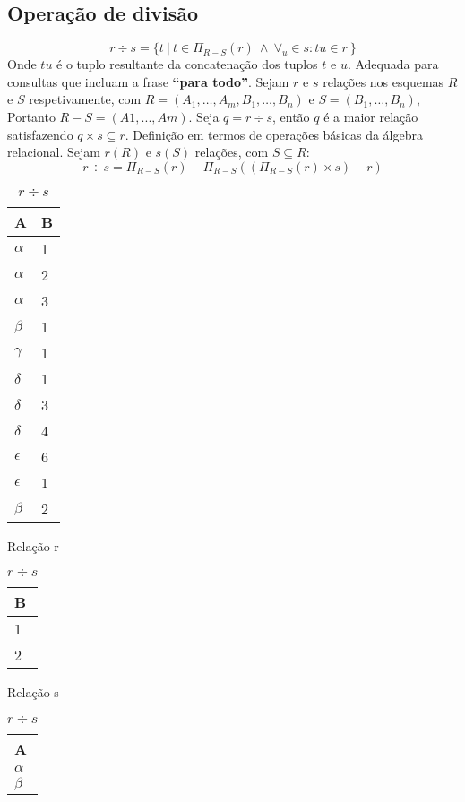 \documentclass{article}
\begin{document}
\subsection{Operação de divisão}
\[
  r \div s = \{t \ | \ t \in \Pi_{R-S}(r) \ \wedge \ \forall_u \in s: tu \in r\ \}
\]
Onde $tu$ é o tuplo resultante da concatenação dos tuplos $t$ e $u$. Adequada para consultas que incluam a frase \textbf{“para todo”}. Sejam $r$ e $s$ relações nos esquemas $R$ e $S$ respetivamente, com $R=(A_1,\dots ,A_m,B_1,\dots ,B_n)$ e $S=(B_1,\dots ,B_n)$, Portanto $R - S = (A1, ..., Am)$. Seja $q = r \div s$, então $q$ é a maior relação satisfazendo $q \times s \subseteq r$.
Definição em termos de operações básicas da álgebra relacional. Sejam $r(R)$ e $s(S)$ relações, com $S \subseteq R$:
\[
  r \div s =\Pi_{R-S}(r) -\Pi_{R-S}((\Pi_{R-S}(r) \times s) - r)
\]
\begin{table}[ht]
  \parbox{.30\linewidth}{
    \centering
    \begin{tabular}{|l|l|}
      \hline
      A          & B \\ \hline
      $\alpha$   & 1 \\ \hline
      $\alpha$   & 2 \\ \hline
      $\alpha$   & 3 \\ \hline
      $\beta$    & 1 \\ \hline
      $\gamma$   & 1 \\ \hline
      $\delta$   & 1 \\ \hline
      $\delta$   & 3 \\ \hline
      $\delta$   & 4 \\ \hline
      $\epsilon$ & 6 \\ \hline
      $\epsilon$ & 1 \\ \hline
      $\beta$    & 2 \\ \hline
    \end{tabular}
    \caption{Relação r}
  }
  \hfill
  \parbox{.30\linewidth}{
    \centering
    \begin{tabular}{|l|}
      \hline
      B \\ \hline
      1 \\ \hline
      2 \\ \hline
    \end{tabular}
    \caption{Relação s}
  }
  \hfill
  \parbox{.30\linewidth}{
    \centering
    \begin{tabular}{|l|}
      \hline
      A        \\\hline
      $\alpha$ \\ \hline
      $\beta$  \\ \hline
    \end{tabular}
    \caption{$r \div s$}
  }
\end{table}
\end{document}
